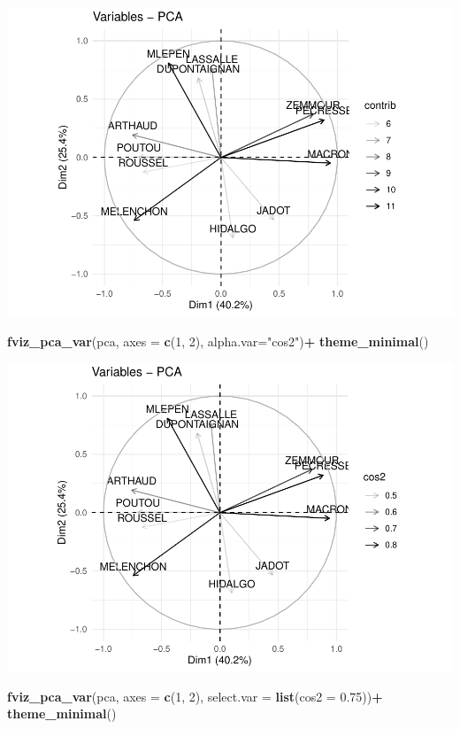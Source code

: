 \documentclass[
]{book}
\newenvironment{Shaded}{\begin{snugshade}}{\end{snugshade}}
\newcommand{\AttributeTok}[1]{\textcolor[rgb]{0.13,0.29,0.53}{#1}}
\newcommand{\DecValTok}[1]{\textcolor[rgb]{0.00,0.00,0.81}{#1}}
\newcommand{\FloatTok}[1]{\textcolor[rgb]{0.00,0.00,0.81}{#1}}
\newcommand{\FunctionTok}[1]{\textcolor[rgb]{0.13,0.29,0.53}{\textbf{#1}}}
\newcommand{\NormalTok}[1]{#1}
\newcommand{\SpecialCharTok}[1]{\textcolor[rgb]{0.81,0.36,0.00}{\textbf{#1}}}
\newcommand{\StringTok}[1]{\textcolor[rgb]{0.31,0.60,0.02}{#1}}
\begin{document}
\includegraphics{bookdown-demo_files/figure-latex/unnamed-chunk-66-1.pdf}

\begin{Shaded}
\begin{Highlighting}[]
\FunctionTok{fviz\_pca\_var}\NormalTok{(pca,  }\AttributeTok{axes =} \FunctionTok{c}\NormalTok{(}\DecValTok{1}\NormalTok{, }\DecValTok{2}\NormalTok{), }\AttributeTok{alpha.var=}\StringTok{"cos2"}\NormalTok{)}\SpecialCharTok{+} \FunctionTok{theme\_minimal}\NormalTok{()}
\end{Highlighting}
\end{Shaded}

\includegraphics{bookdown-demo_files/figure-latex/unnamed-chunk-66-2.pdf}

\begin{Shaded}
\begin{Highlighting}[]
\FunctionTok{fviz\_pca\_var}\NormalTok{(pca,  }\AttributeTok{axes =} \FunctionTok{c}\NormalTok{(}\DecValTok{1}\NormalTok{, }\DecValTok{2}\NormalTok{), }\AttributeTok{select.var =} \FunctionTok{list}\NormalTok{(}\AttributeTok{cos2 =} \FloatTok{0.75}\NormalTok{))}\SpecialCharTok{+} \FunctionTok{theme\_minimal}\NormalTok{()}
\end{Highlighting}
\end{Shaded}
\end{document}
